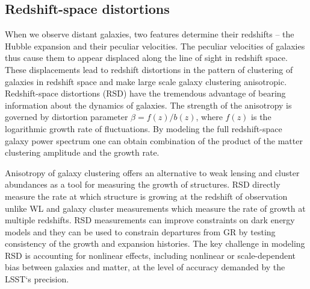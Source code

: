 \subsection{Redshift-space distortions}
\label{sec:rsd}
When we observe distant galaxies, two features determine their redshifts -- the Hubble expansion and their peculiar velocities. The peculiar velocities of galaxies thus cause them to appear displaced along the line of sight in redshift space. These displacements lead to redshift distortions in the pattern of clustering of galaxies in redshift space and make large scale galaxy clustering anisotropic. Redshift-space distortions (RSD) have the tremendous advantage of bearing information about the dynamics of galaxies. The strength of the anisotropy is governed by distortion parameter $\beta = f(z)/b(z)$, where $f(z)$ is the logarithmic growth rate of fluctuations. By modeling the full redshift-space galaxy power spectrum one can obtain combination of the product of the matter clustering amplitude and the growth rate.

Anisotropy of galaxy clustering offers an alternative to weak lensing and cluster abundances as a tool for measuring the growth of structures. RSD directly measure the rate at which structure is growing at the redshift of observation unlike WL and galaxy cluster measurements  which measure the rate of growth at multiple redshifts. RSD measurements can improve constraints on dark energy models and they can be used to constrain departures from GR by testing consistency of the growth and expansion histories. The key challenge in modeling RSD is accounting for nonlinear effects, including nonlinear or scale-dependent bias between galaxies and matter, at the level of accuracy demanded by the LSST`s precision.